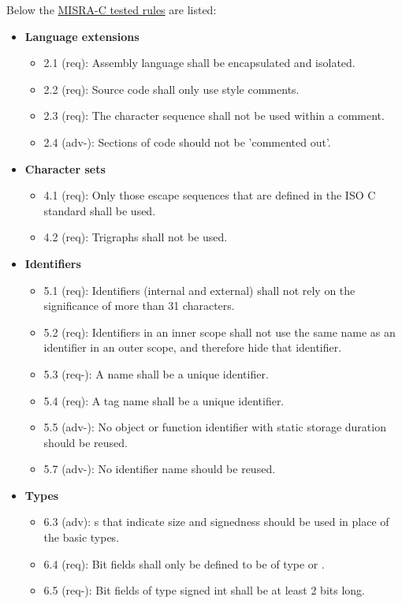 Below the \underline{MISRA-C tested rules} are listed:
\begin{itemize}
\item \textbf{Language extensions}
\begin{itemize}
\item 2.1 (req): Assembly language shall be encapsulated and isolated.
\item 2.2 (req): Source code shall only use  style comments.
\item 2.3 (req): The character sequence \inl{/*} shall not be used within a comment.
\item 2.4 (adv-): Sections of code should not be 'commented out'.
\end{itemize}
\item \textbf{Character sets}
\begin{itemize}
\item 4.1 (req): Only those escape sequences that are defined in the ISO C standard shall be used.
\item 4.2 (req): Trigraphs shall not be used.
\end{itemize}
\item \textbf{Identifiers}
\begin{itemize}
\item 5.1 (req): Identifiers (internal and external) shall not rely on the significance of more than 31 characters.
\item 5.2 (req): Identifiers in an inner scope shall not use the same name as an identifier in an outer scope, and therefore hide that identifier.
\item 5.3 (req-): A  name shall be a unique identifier.
\item 5.4 (req): A tag name shall be a unique identifier.
\item 5.5 (adv-): No object or function identifier with static storage duration should be reused.
\item 5.7 (adv-): No identifier name should be reused.
\end{itemize}
\item \textbf{Types}
\begin{itemize}
\item 6.3 (adv): s that indicate size and signedness should be used in place of the basic types.
\item 6.4 (req): Bit fields shall only be defined to be of type  or .
\item 6.5 (req-): Bit fields of type signed int shall be at least 2 bits long.

\end{itemize}
\end{itemize}

